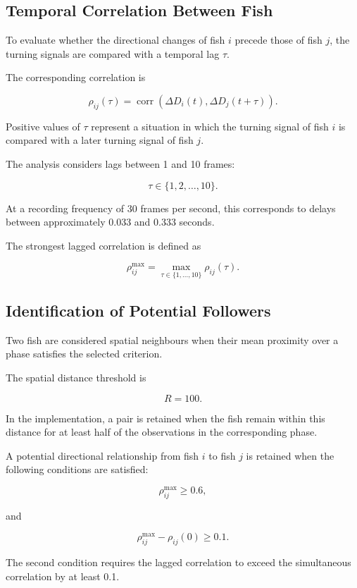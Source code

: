 \documentclass[10pt,a4paper]{article}
\begin{document}
\subsection{Temporal Correlation Between Fish}

To evaluate whether the
directional changes of fish $i$
precede those of fish $j$,
the turning signals are compared
with a temporal lag $\tau$.

The corresponding correlation is

\[
\rho_{ij}(\tau)
=
\operatorname{corr}
\left(
\Delta D_i(t),
\Delta D_j(t+\tau)
\right).
\]

Positive values of $\tau$
represent a situation in which
the turning signal of fish $i$
is compared with a later
turning signal of fish $j$.

The analysis considers
lags between 1 and 10 frames:

\[
\tau\in\{1,2,\ldots,10\}.
\]

At a recording frequency
of 30 frames per second,
this corresponds to delays
between approximately
0.033 and 0.333 seconds.

The strongest lagged correlation
is defined as

\[
\rho_{ij}^{\max}
=
\max_{\tau\in\{1,\ldots,10\}}
\rho_{ij}(\tau).
\]

\subsection{Identification of Potential Followers}

Two fish are considered
spatial neighbours when
their mean proximity
over a phase satisfies
the selected criterion.

The spatial distance
threshold is

\[
R=100.
\]

In the implementation,
a pair is retained when
the fish remain within
this distance for at least
half of the observations
in the corresponding phase.

A potential directional
relationship from fish $i$
to fish $j$ is retained
when the following
conditions are satisfied:

\[
\rho_{ij}^{\max}\geq 0.6,
\]

and

\[
\rho_{ij}^{\max}
-
\rho_{ij}(0)
\geq 0.1.
\]

The second condition
requires the lagged
correlation to exceed
the simultaneous
correlation by at least 0.1.
\end{document}
